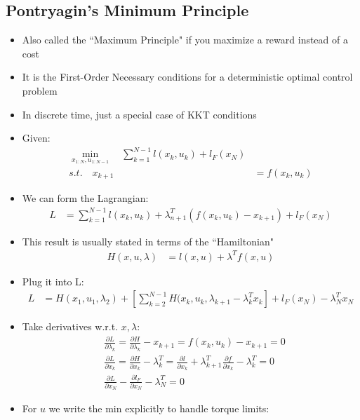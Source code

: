 \documentclass[11pt]{article}
\begin{document}
\subsection{Pontryagin's Minimum Principle}
\begin{itemize}
    \item Also called the ``Maximum Principle" if you maximize a reward instead of a cost
    \item It is the First-Order Necessary conditions for a deterministic optimal control problem
    \item In discrete time, just a special case of KKT conditions
    \item Given:
    \begin{align*}
        \min_{x_{1:N},u_{1:N-1}} \quad \sum_{k=1}^{N-1} l(x_k,u_k) + l_F(x_N)
        \\
        s.t. \quad x_{k+1} &= f(x_k,u_k)
    \end{align*}
    \item We can form the Lagrangian:
    \begin{align*}
        L &= \sum_{k=1}^{N-1} l(x_k,u_k) + \lambda_{n+1}^T(f(x_k,u_k) - x_{k+1}) + l_F(x_N) 
    \end{align*}
    \item This result is usually stated in terms of the ``Hamiltonian"
    \begin{align*}
        H(x,u,\lambda) &= l(x,u) + \lambda^Tf(x,u)
    \end{align*}
    \item Plug it into L:
    \begin{align*}
        L &= H(x_1,u_1,\lambda_2) + \left[\sum_{k=2}^{N-1}H(x_k,u_k,\lambda_{k+1} - \lambda_k^Tx_k \right] + l_F(x_N) - \lambda_N^Tx_N
    \end{align*}
    \item Take derivatives w.r.t. $x,\lambda$:
    \begin{align*}
        &\frac{\partial L}{\partial \lambda_k} = \frac{\partial H}{\partial \lambda_k} - x_{k+1} = f(x_k,u_k) - x_{k+1} = 0
        \\
        &\frac{\partial L}{\partial x_k} = \frac{\partial H}{\partial x_k} - \lambda_k^T = \frac{\partial l}{\partial x_k} + \lambda_{k+1}^T \frac{\partial f}{\partial x_k} - \lambda_k^T = 0
        \\
        &\frac{\partial L}{\partial x_N} - \frac{\partial l_F}{\partial x_N} - \lambda_N^T = 0 
     \end{align*}
     \item For $u$ we write the min explicitly to handle torque limits:

\end{itemize}
\end{document}
